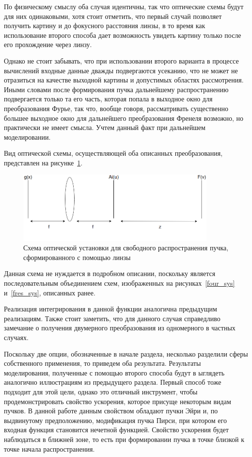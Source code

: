 {    По физическому смыслу оба случая идентичны, так что оптические схемы будут для них одинаковыми,
    хотя стоит отметить, что первый случай позволяет получить картину и до фокусного расстояния линзы,
    в то время как использование второго способа дает возможность увидеть картину только после его прохождение через линзу.

    Однако не стоит забывать, что при использовании второго варианта в процессе вычислений
    входные данные дважды подвергаются усеканию, что не может не отразиться на качестве
    выходной картины и допустимых областях рассмотрения. Иными словами после формирования пучка
    дальнейшему распространению подвергается только та его часть, которая попала в выходное окно для преобразования Фурье,
    так что, вообще говоря, рассматривать существенно большее выходное окно для дальнейшего преобразования Френеля возможно,
    но практически не имеет смысла. Учтем данный факт при дальнейшем моделировании.

    Вид оптической схемы, осуществляющей оба описанных преобразования, представлен на рисунке~\ref{four_fres_sys}.

    \begin{figure}[H]
        \begin{center}
            \includegraphics[width=10cm]{plots/four_fres_sys}
            \caption{Схема оптической установки для свободного распространения пучка, сформированного с помощью линзы}
            \label{four_fres_sys}
        \end{center}
    \end{figure}
    Данная схема не нуждается в подробном описании, поскольку является последовательным объединением схем,
    изображенных на рисунках~\ref{four_sys} и~\ref{fres_sys}, описанных ранее.

    Реализация интегрирования в данной функции аналогична предыдущим реализациям.
    Также стоит заметить, что для данного случая справедливо замечание
    о получения двумерного преобразования из одномерного в частных случаях.

    Поскольку две опции, обозначенные в начале раздела, несколько разделили сферы собственного применения,
    то приведем оба результата. Результаты моделирования, полученные с помощью второго способа будут в
    ыглядеть аналогично иллюстрациям из предыдущего раздела. Первый способ тоже подходит для этой цели,
    однако это отличный инструмент, чтобы продемонстрировать свойство ускорения, которое присуще некоторым видам пучков.
    В данной работе данным свойством обладают пучки Эйри и, по выдвинутому предположению,
    модификация пучка Пирси, при котором его входная функция становится нечетной функцией.
    Свойство ускорения будет наблюдаться в ближней зоне, то есть при формировании пучка в точке близкой к точке начала распространения.

}
